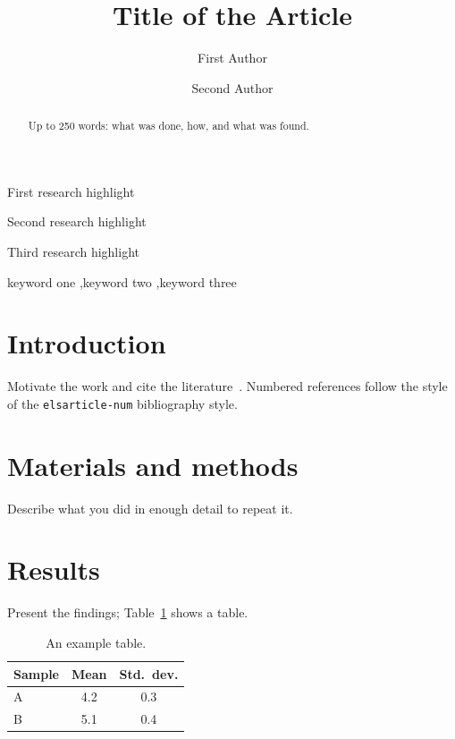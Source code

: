 \documentclass[preprint,12pt]{elsarticle}
\begin{document}
\begin{frontmatter}

\title{Title of the Article}

\author[first]{First Author}
\author[second]{Second Author}


\begin{abstract}
Up to 250 words: what was done, how, and what was found.
\end{abstract}

\begin{highlights}
\item First research highlight
\item Second research highlight
\item Third research highlight
\end{highlights}

\begin{keyword}
keyword one \sep keyword two \sep keyword three
\end{keyword}

\end{frontmatter}

\section{Introduction}
Motivate the work and cite the literature~\cite{knuth84}. Numbered references
follow the style of the \texttt{elsarticle-num} bibliography style.

\section{Materials and methods}
Describe what you did in enough detail to repeat it.

\section{Results}
Present the findings; Table~\ref{tab:res} shows a table.

\begin{table}[h]
  \centering
  \caption{An example table.}
  \label{tab:res}
  \begin{tabular}{lcc}
    \toprule
    Sample & Mean & Std.\ dev. \\
    \midrule
    A & 4.2 & 0.3 \\
    B & 5.1 & 0.4 \\
    \bottomrule
  \end{tabular}
\end{table}
\end{document}
